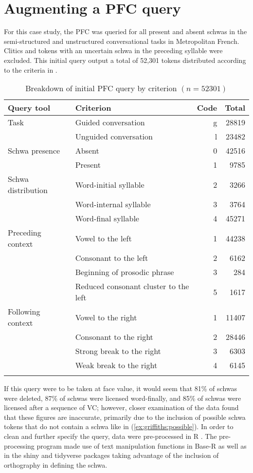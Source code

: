 \documentclass[output=paper,colorlinks,citecolor=brown,
]{langscibook}
\begin{document}
\section{Augmenting a PFC query}
\label{sec:griffiths:pre}
For this case study, the PFC was queried for all present and absent schwas in the semi-structured and unstructured conversational tasks in Metropolitan French. Clitics and tokens with an uncertain schwa in the preceding syllable were excluded. This initial query output a total of 52,301 tokens distributed according to the criteria in .

\begin{table}
\caption{Breakdown of initial PFC query by criterion $(n=52301)$}
\label{tab:griffiths:query}
\begin{tabular}{llrr} \lsptoprule
\textbf{Query tool} & \textbf{Criterion} & \textbf{Code} & \textbf{Total} \\ \midrule
Task & Guided conversation & g & 28819 \\
 & Unguided conversation & l & 23482 \\ \midrule
Schwa presence & Absent & 0 & 42516 \\
 & Present & 1 & 9785 \\ \midrule
Schwa distribution & Word-initial syllable & 2 & 3266 \\
 & Word-internal syllable & 3 & 3764 \\
 & Word-final syllable & 4 & 45271 \\ \midrule
Preceding context & Vowel to the left & 1 & 44238 \\
 & Consonant to the left & 2 & 6162 \\
 & Beginning of prosodic phrase & 3 & 284 \\
 & Reduced consonant cluster to the left & 5 & 1617 \\ \midrule
Following context & Vowel to the right & 1 & 11407 \\
 & Consonant to the right & 2 & 28446 \\
 & Strong break to the right & 3 & 6303 \\
 & Weak break to the right & 4 & 6145 \\  \lspbottomrule
\end{tabular}
\end{table}

If this query were to be taken at face value, it would seem that 81\% of schwas were deleted, 87\% of schwas were licensed word-finally, and 85\% of schwas were licensed after a sequence of VC; however, closer examination of the data found that these figures are inaccurate, primarily due to the inclusion of possible schwa tokens that do not contain a schwa like in (\ref{ex:griffiths:possible}). In order to clean and further specify the query, data were pre-processed in R \citep{r_core_team_r_2019}. The pre-processing program made use of text manipulation functions in Base-R as well as in the shiny \citep{shiny} and tidyverse \citep{tidyverse} packages taking advantage of the inclusion of orthography in defining the schwa.
\end{document}
